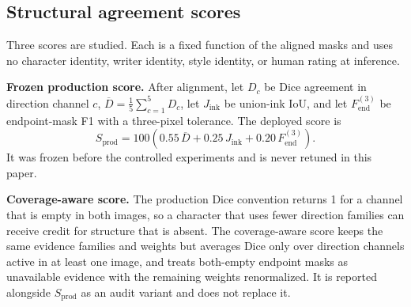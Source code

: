 \subsection{Structural agreement scores}
\label{sec:scores}

Three scores are studied. Each is a fixed function of the aligned masks and
uses no character identity, writer identity, style identity, or human rating
at inference.

\medskip
\noindent\textbf{Frozen production score.}
After alignment, let \(D_c\) be Dice agreement in direction channel \(c\),
\(\overline{D}=\tfrac{1}{5}\sum_{c=1}^{5}D_c\), let \(J_{\mathrm{ink}}\) be
union-ink IoU, and let \(F_{\mathrm{end}}^{(3)}\) be endpoint-mask F1 with a
three-pixel tolerance. The deployed score is
\[
S_{\mathrm{prod}}
=100\left(
0.55\,\overline{D}
+0.25\,J_{\mathrm{ink}}
+0.20\,F_{\mathrm{end}}^{(3)}
\right).
\]
It was frozen before the controlled experiments and is never retuned in
this paper.

\medskip
\noindent\textbf{Coverage-aware score.}
The production Dice convention returns 1 for a channel that is empty in both
images, so a character that uses fewer direction families can receive credit
for structure that is absent. The coverage-aware score keeps the same
evidence families and weights but averages Dice only over direction channels
active in at least one image, and treats both-empty endpoint masks as
unavailable evidence with the remaining weights renormalized. It is reported alongside \(S_{\mathrm{prod}}\) as an audit variant and does
not replace it.

